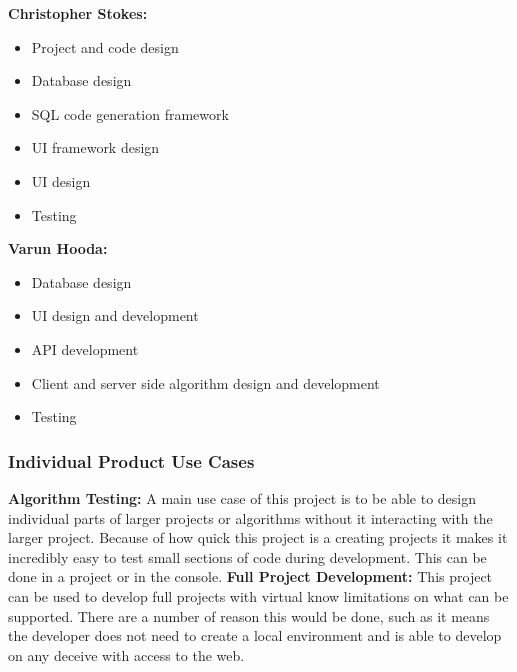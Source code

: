 \documentclass[12pt, titlepage]{article}
\begin{document}
    \textbf{Christopher Stokes:}
    \begin{itemize}
        \item Project and code design
        \item Database design
        \item SQL code generation framework
        \item UI framework design
        \item UI design
        \item Testing
    \end{itemize}


    \textbf{Varun Hooda:}
    \begin{itemize}
        \item Database design
        \item UI design and development
        \item API development
        \item Client and server side algorithm design and development
        \item Testing
    \end{itemize}

    \subsubsection{Individual Product Use Cases}
		\textbf{Algorithm Testing:} A main use case of this project is to be able
		to design individual parts of larger projects or algorithms without it
		interacting with the larger project. Because of how quick this project is a
		creating  projects it makes it incredibly easy to test small sections of
		code during development. This can be done in a project or in the console.
		\newline\newline
		\textbf{Full Project Development:} This project can be used to develop full
		projects with virtual know limitations on what can be supported.  There are
		a number of reason this would be done, such as it means the developer does
		not need to create a local environment and is able to develop on any
		deceive with access to the web.
\end{document}

